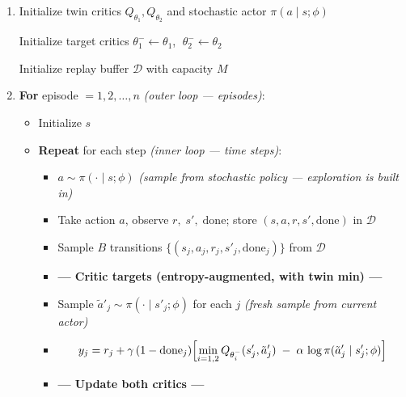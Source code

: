 \documentclass[11pt]{article}
\providecommand{\tightlist}{%
      \setlength{\itemsep}{0pt}\setlength{\parskip}{0pt}}
\begin{document}
\begin{enumerate}
\def\labelenumi{\arabic{enumi}.}
\item
  Initialize twin critics \(Q_{\theta_1}, Q_{\theta_2}\) and stochastic
  actor \(\pi(a \mid s;\phi)\)

  Initialize target critics \(\theta_1^- \leftarrow \theta_1\),
  \(\;\theta_2^- \leftarrow \theta_2\)

  Initialize replay buffer \(\mathcal{D}\) with capacity \(M\)
\item
  \textbf{For} episode \(= 1, 2, \ldots, n\) \emph{(outer loop ---
  episodes)}:

  \begin{itemize}
  \tightlist
  \item
    Initialize \(s\)
  \item
    \textbf{Repeat} for each step \emph{(inner loop --- time steps)}:

    \begin{itemize}
    \item
      \(a \sim \pi(\cdot \mid s;\phi)\) \emph{(sample from stochastic
      policy --- exploration is built in)}
    \item
      Take action \(a\), observe \(r,\; s',\; \text{done}\); store
      \((s, a, r, s', \text{done})\) in \(\mathcal{D}\)
    \item
      Sample \(B\) transitions
      \(\{(s_j, a_j, r_j, s'_j, \text{done}_j)\}\) from \(\mathcal{D}\)
    \item
      \textbf{--- Critic targets (entropy-augmented, with twin min) ---}
    \item
      Sample \(\tilde{a}'_j \sim \pi(\cdot \mid s'_j;\phi)\) for each
      \(j\) \emph{(fresh sample from current actor)}
    \item
      \[y_j = r_j + \gamma\,(1-\text{done}_j)\Bigl[\min_{i=1,2} Q_{\theta_i^-}(s'_j, \tilde{a}'_j) \;-\; \alpha\, \log\pi(\tilde{a}'_j \mid s'_j;\phi)\Bigr]\]
    \item
      \textbf{--- Update both critics ---}


\end{itemize}
\end{itemize}
\end{enumerate}
\end{document}
